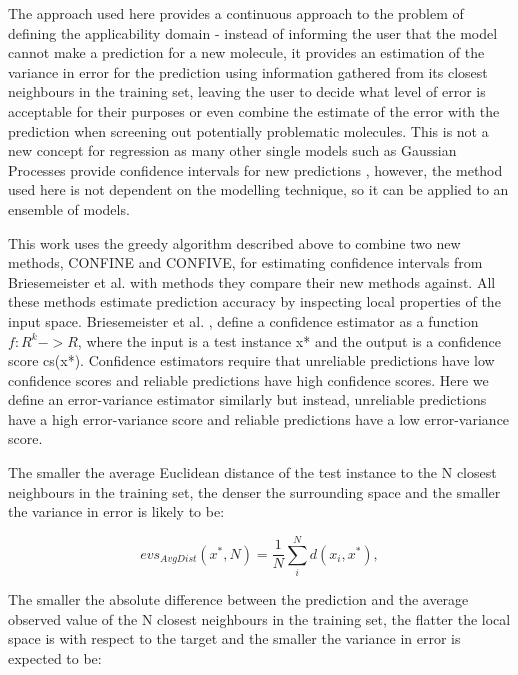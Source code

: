 \documentclass[10pt]{bmc_article}
\newenvironment{bmcformat}{\begin{raggedright}\baselineskip20pt\sloppy\setboolean{publ}{false}}{\end{raggedright}\baselineskip20pt\sloppy}
\begin{document}
\begin{bmcformat}
The approach used here provides a continuous approach to the problem of defining the applicability domain - instead of informing the user that the model cannot make a prediction for a new molecule, it provides an estimation of the variance in error for the prediction using information gathered from its closest neighbours in the training set, leaving the user to decide what level of error is acceptable for their purposes or even combine the estimate of the error with the prediction when screening out potentially problematic molecules. This is not a new concept for regression as many other single models such as Gaussian Processes provide confidence intervals for new predictions \cite{schwaighofer_accurate_2007}, however, the method used here is not dependent on the modelling technique, so it can be applied to an ensemble of models. 

This work uses the greedy algorithm described above to combine two new methods, CONFINE and CONFIVE, for estimating confidence intervals from Briesemeister et al. \cite{briesemeister_no_2012} with methods they compare their new methods against. All these methods estimate prediction accuracy by inspecting local properties of the input space. Briesemeister et al. \cite{briesemeister_no_2012}, define a confidence estimator as a function $f : R^k -> R$, where the input is a test instance x* and the output is a confidence score cs(x*). Confidence estimators require that unreliable predictions have low confidence scores and reliable predictions have high confidence scores. Here we define an error-variance estimator similarly but instead, unreliable predictions have a high error-variance score and reliable predictions have a low error-variance score.

The smaller the average Euclidean distance of the test instance to the N closest neighbours in the training set, the denser the surrounding space and the smaller the variance in error is likely to be: 

\begin{equation}
evs_{AvgDist}(x^*, N) = \frac{1}{N}\sum_i^N{d(x_i, x^*)},
\end{equation}

The smaller the absolute difference between the prediction and the average observed value of the N closest neighbours in the training set, the flatter the local space is with respect to the target and the smaller the variance in error is expected to be:


\end{bmcformat}
\end{document}
